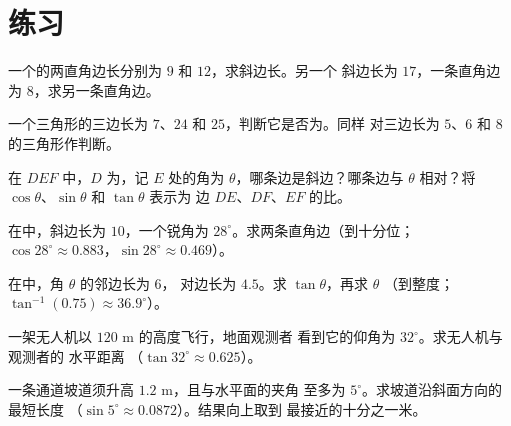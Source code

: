 \section{练习}

\begin{exercise}[$\star$]\label{exo:g9:trig:1}
一个的两直角边长分别为 $9$ 和 $12$，求斜边长。另一个
斜边长为 $17$，一条直角边为 $8$，求另一条直角边。
\end{exercise}

\begin{exercise}[$\star$]\label{exo:g9:trig:2}
一个三角形的三边长为 $7$、$24$ 和 $25$，判断它是否为。同样
对三边长为 $5$、$6$ 和 $8$ 的三角形作判断。
\end{exercise}

\begin{exercise}[$\star$]\label{exo:g9:trig:3}
在 $DEF$ 中，$D$ 为，记 $E$ 处的角为
$\theta$，哪条边是斜边？哪条边与
$\theta$ 相对？将 $\cos\theta$、$\sin\theta$ 和 $\tan\theta$ 表示为
边 $DE$、$DF$、$EF$ 的比。
\end{exercise}

\begin{exercise}[$\star$]\label{exo:g9:trig:4}
在中，斜边长为 $10$，一个锐角为
$28^\circ$。求两条直角边（到十分位；
$\cos 28^\circ \approx 0.883$，$\sin 28^\circ \approx 0.469$）。
\end{exercise}

\begin{exercise}[$\star$]\label{exo:g9:trig:5}
在中，角 $\theta$ 的邻边长为 $6$，
对边长为 $4.5$。求 $\tan\theta$，再求 $\theta$
（到整度；$\tan^{-1}(0.75) \approx 36.9^\circ$）。
\end{exercise}

\begin{exercise}[$\star\star$]\label{exo:g9:trig:6}
一架无人机以 $120$ m 的高度飞行，地面观测者
看到它的仰角为 $32^\circ$。求无人机与观测者的
水平距离
（$\tan 32^\circ \approx 0.625$）。
\end{exercise}

\begin{exercise}[$\star\star$]\label{exo:g9:trig:7}
一条通道坡道须升高 $1.2$ m，且与水平面的夹角
至多为 $5^\circ$。求坡道沿斜面方向的最短长度
（$\sin 5^\circ \approx 0.0872$）。结果向上取到
最接近的十分之一米。
\end{exercise}

